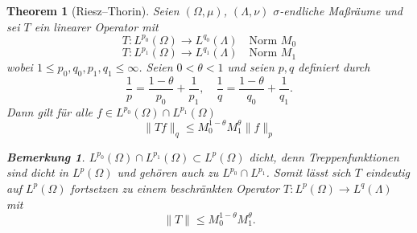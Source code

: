 \documentclass[
paper=a4,
bibtotocnumbered,
liststotocnumbered,
tablecaptionabove,
pointlessnumbers,
twoside,
openright,
10pt
]
{report}
\newtheorem{thm}{Theorem}[chapter]
\theoremstyle{definition}
\newtheorem*{rem}{Bemerkung}
\numberwithin{equation}{chapter}
\begin{document}
\begin{thm}[Riesz--Thorin]\label{st3}
Seien $(\Omega, \mu)$, $(\Lambda,\nu)$ $\sigma$-endliche Maßräume und sei $T$ ein linearer Operator mit
\begin{equation}
T: L^{p_0} (\Omega) \to L^{q_0} (\Lambda)\quad \text{Norm } M_0
\end{equation}
\begin{equation}
T: L^{p_1} (\Omega) \to L^{q_1} (\Lambda)\quad \text{Norm } M_1
\end{equation}
wobei $1\le p_0, q_0, p_1, q_1\le \infty$. Seien $0<\theta <1$ und seien $p,q$ definiert durch
\begin{equation}
\frac{1}{p} = \frac{1-\theta}{p_0} + \frac{1}{p_1}, \quad \frac{1}{q} = \frac{1-\theta}{q_0} + \frac{1}{q_1}.
\end{equation}
Dann gilt für alle $f\in L^{p_0}(\Omega) \cap L^{p_1}(\Omega)$
\begin{equation}
\| Tf\|_q \le M_0^{1-\theta} M_1^\theta \| f\|_p
\end{equation}
\begin{rem}
$L^{p_0}(\Omega) \cap L^{p_1} (\Omega) \subset L^p(\Omega)$ dicht, denn Treppenfunktionen sind dicht in $L^p(\Omega)$ und gehören auch zu $L^{p_0} \cap L^{p_1}$. Somit lässt sich $T$ eindeutig auf $L^p(\Omega)$ fortsetzen zu einem beschränkten Operator $T:L^p(\Omega) \to L^q(\Lambda)$ mit 
\begin{equation}
\| T\| \le M_0^{1-\theta} M_1^\theta.
\end{equation}
\end{rem}
\end{thm}
\end{document}
